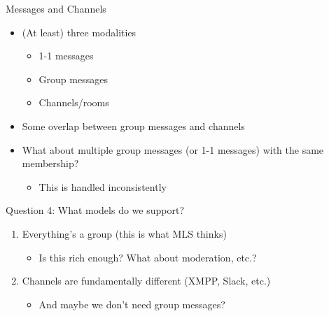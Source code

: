 \documentclass[helvetica]{beamer}
\begin{document}
\begin{frame}{Messages and Channels}
  \begin{itemize}
  \item (At least) three modalities
    \begin{itemize}
    \item 1-1 messages
    \item Group messages
    \item Channels/rooms
    \end{itemize}
    
  \item Some overlap between group messages and channels
  \item What about multiple group messages (or 1-1 messages) with the same membership?
    \begin{itemize}
    \item This is handled inconsistently
    \end{itemize}
  \end{itemize}
\end{frame}

\begin{frame}{Question 4: What models do we support?}

  \begin{enumerate}
  \item Everything's a group (this is what MLS thinks)
    \begin{itemize}
    \item Is this rich enough? What about moderation, etc.?      
    \end{itemize}
  \item Channels are fundamentally different (XMPP, Slack, etc.)
    \begin{itemize}
    \item And maybe we don't need group messages?
      \end{itemize}
  \end{enumerate}
\end{frame}
\end{document}
